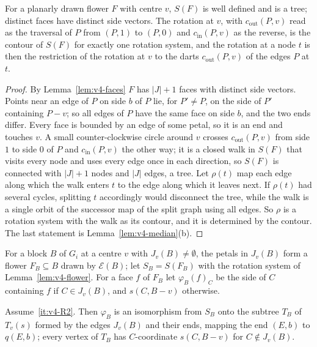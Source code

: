 \begin{lemma}[flowers]\label{lem:v4-flower}
For a planarly drawn flower $F$ with centre $v$, $S(F)$ is well defined and
is a tree; distinct faces have distinct side vectors. The rotation at $v$,
with $c_{\mathrm{out}}(P,v)$ read as the traversal of $P$ from $(P,1)$ to
$(P,0)$ and $c_{\mathrm{in}}(P,v)$ as the reverse, is the contour of $S(F)$
for exactly one rotation system, and the rotation at a node $t$ is then the
restriction of the rotation at $v$ to the darts $c_{\mathrm{out}}(P,v)$ of
the edges $P$ at $t$.
\end{lemma}

\begin{proof}
By Lemma~\ref{lem:v4-faces} $F$ has $|J|+1$ faces with distinct side
vectors. Points near an edge of $P$ on side $b$ of $P$ lie, for $P'\neq P$,
on the side of $P'$ containing $P-v$; so all edges of $P$ have the same face
on side $b$, and the two ends differ. Every face is bounded by an edge of
some petal, so it is an end and touches $v$. A small counter-clockwise
circle around $v$ crosses $c_{\mathrm{out}}(P,v)$ from side $1$ to side $0$
of $P$ and $c_{\mathrm{in}}(P,v)$ the other way; it is a closed walk in
$S(F)$ that visits every node and uses every edge once in each direction, so
$S(F)$ is connected with $|J|+1$ nodes and $|J|$ edges, a tree. Let
$\rho(t)$ map each edge along which the walk enters $t$ to the edge along
which it leaves next. If $\rho(t)$ had several cycles, splitting $t$
accordingly would disconnect the tree, while the walk is a single orbit of
the successor map of the split graph using all edges. So $\rho$ is a
rotation system with the walk as its contour, and it is determined by the
contour. The last statement is Lemma~\ref{lem:v4-median}(b).
\end{proof}

For a block $B$ of $G_i$ at a centre $v$ with $J_v(B)\neq\emptyset$, the
petals in $J_v(B)$ form a flower $F_B\subseteq B$ drawn by $\mathcal E(B)$;
let $S_B=S(F_B)$ with the rotation system of Lemma~\ref{lem:v4-flower}. For
a face $f$ of $F_B$ let $\varphi_B(f)_C$ be the side of $C$ containing $f$ if
$C\in J_v(B)$, and $s(C,B-v)$ otherwise.

\begin{lemma}\label{lem:v4-subtree}
Assume~\ref{it:v4-R2}. Then $\varphi_B$ is an isomorphism from $S_B$ onto the
subtree $T_B$ of $T_v(s)$ formed by the edges $J_v(B)$ and their ends, mapping
the end $(E,b)$ to $q(E,b)$; every vertex of $T_B$ has $C$-coordinate
$s(C,B-v)$ for $C\notin J_v(B)$.
\end{lemma}

